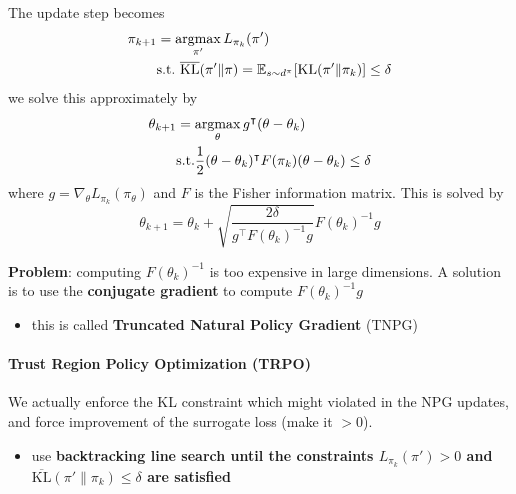 \documentclass[../course-notes.tex]{subfiles}
\begin{document}
The update step becomes
\[
\begin{aligned}
	\pi_{k+1} &= \operatorname*{\mathrm{argmax}}_{\pi'} L_{\pi_k}(\pi')  \\
	& \mathrm{s.t.} \ \overline{\mathrm{KL}}(\pi'\|\pi) = \operatorname{\mathbb{E}}_{s\sim d^\pi}[\mathrm{KL}(\pi'\|\pi_k)] \leq \delta
\end{aligned}
\]
we solve this approximately by
\[
\begin{aligned}
	\theta_{k+1} &= \operatorname*{\mathrm{argmax}}_\theta g^\intercal (\theta - \theta_k)  \\
	& \mathrm{s.t.} \frac{1}{2}(\theta-\theta_k)^\intercal F(\pi_k) (\theta - \theta_k) \leq \delta
\end{aligned}
\]
where $g = \nabla_\theta L_{\pi_k}(\pi_\theta)$ and $F$ is the Fisher information matrix. This is solved by
\begin{equation}\label{eq:NPGupdate}
	\theta_{k+1} = \theta_k + \sqrt{\frac{2\delta}{g^\intercal F(\theta_k)^{-1}g}} F(\theta_k)^{-1}g
\end{equation}


\textbf{\redfont Problem}: computing $F(\theta_k)^{-1}$ is too expensive in large dimensions. A solution is to use the \textbf{conjugate gradient} to compute $F(\theta_k)^{-1}g$
\begin{itemize}
	\item[\textrightarrow] this is called \textbf{\bluefont Truncated Natural Policy Gradient} (TNPG)
\end{itemize}


\paragraph{Trust Region Policy Optimization (TRPO)} We actually enforce the KL constraint which might violated in the NPG updates, and force improvement of the surrogate loss (make it $>0$).
\begin{itemize}
	\item[\textrightarrow] use \textbf{backtracking line search until the constraints $L_{\pi_k}(\pi') > 0$ and $\overline{\mathrm{KL}}(\pi'\|\pi_k) \leq \delta$ are satisfied}
\end{itemize}
\end{document}
